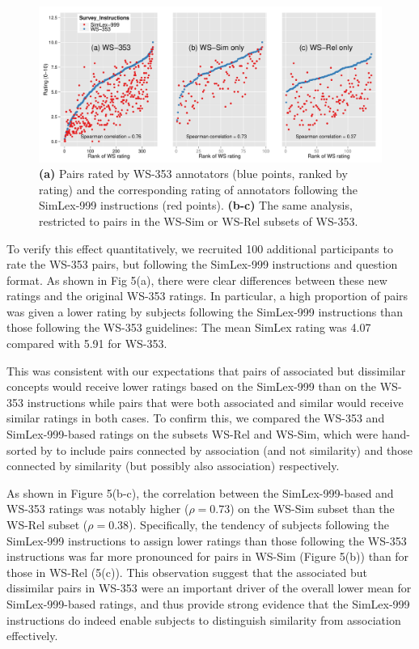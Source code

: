 \documentclass[fullname]{clv2}
\begin{document}
\begin{figure}[ht]  \includegraphics[width =\textwidth]{Figure_6_CL} \caption{{\bf(a)} Pairs rated by WS-353 annotators (blue points, ranked by rating) and the corresponding rating of annotators following the SimLex-999 instructions (red points). {\bf(b-c)} The same analysis, restricted to pairs in the WS-Sim or WS-Rel subsets of WS-353.}\end{figure}  



To verify this effect quantitatively, we recruited 100 additional participants to rate the WS-353 pairs, but following the SimLex-999 instructions and question format. As shown in Fig 5(a), there were clear differences between these new ratings and the original WS-353 ratings. In particular, a high proportion of pairs was given a lower rating by subjects following the SimLex-999 instructions than those following the WS-353 guidelines: The mean SimLex rating was 4.07 compared with 5.91 for WS-353. 



This was consistent with our expectations that pairs of associated but dissimilar concepts would receive lower ratings based on the SimLex-999 than on the WS-353 instructions while pairs that were both associated and similar would receive similar ratings in both cases. To confirm this, we compared the WS-353 and SimLex-999-based ratings on the subsets WS-Rel and WS-Sim, which were hand-sorted by  to include pairs connected by association (and not similarity) and those connected by similarity (but possibly also association) respectively.  



As shown in Figure 5(b-c), the correlation between the SimLex-999-based and WS-353 ratings was notably higher (\(\rho=0.73\)) on the WS-Sim subset than the WS-Rel subset (\(\rho=0.38\)). Specifically, the tendency of subjects following the SimLex-999 instructions to assign lower ratings than those following the WS-353 instructions was far more pronounced for pairs in WS-Sim (Figure 5(b)) than for those in WS-Rel (5(c)). This observation suggest that the associated but dissimilar pairs in WS-353 were an important driver of the overall lower mean for SimLex-999-based ratings, and thus provide strong evidence that the SimLex-999 instructions do indeed enable subjects to distinguish similarity from association effectively. 
\end{document}
